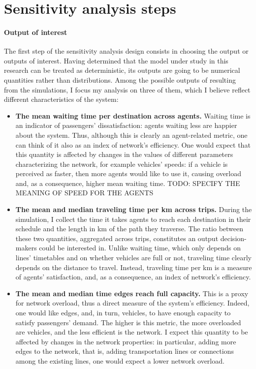 
\section{Sensitivity analysis steps} \label{sec:ch4_steps}

\paragraph{Output of interest}
The first step of the sensitivity analysis design consists in choosing the output or outputs of interest. Having determined that the model under study in this research can be treated as deterministic, its outputs are going to be numerical quantities rather than distributions. Among the possible outputs of resulting from the simulations, I focus my analysis on three of them, which I believe reflect different characteristics of the system:
\begin{itemize}
    \item \textbf{The mean waiting time per destination across agents.} Waiting time is an indicator of passengers' dissatisfaction: agents waiting less are happier about the system. Thus, although this is clearly an agent-related metric, one can think of it also as an index of network's efficiency. One would expect that this quantity is affected by changes in the values of different parameters characterizing the network, for example vehicles' speeds: if a vehicle is perceived as faster, then more agents would like to use it, causing overload and, as a consequence, higher mean waiting time. 
    TODO: SPECIFY THE MEANING OF SPEED FOR THE AGENTS
    \item \textbf{The mean and median traveling time per km across trips.} During the simulation, I collect the time it takes agents to reach each destination in their schedule and the length in km of the path they traverse. The ratio between these two quantities, aggregated across trips, constitutes an output decision-makers could be interested in. Unlike waiting time, which only depends on lines' timetables and on whether vehicles are full or not, traveling time clearly depends on the distance to travel. Instead, traveling time per km is a measure of agents' satisfaction, and, as a consequence, an index of network's efficiency.
    \item \textbf{The mean and median time edges reach full capacity.} This is a proxy for network overload, thus a direct measure of the system's efficiency. Indeed, one would like edges, and, in turn, vehicles, to have enough capacity to satisfy passengers' demand. The higher is this metric, the more overloaded are vehicles, and the less efficient is the network. I expect this quantity to be affected by changes in the network properties: in particular, adding more edges to the network, that is, adding transportation lines or connections among the existing lines, one would expect a lower network overload.
\end{itemize}
